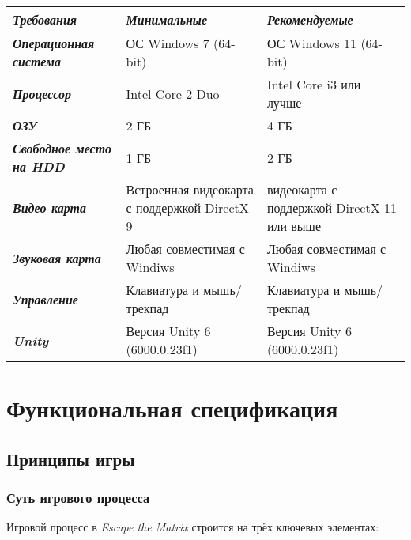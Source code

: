 \documentclass{article}
\begin{document}
\begin{center}
    \begin{tabular}{|p{4cm}|p{4cm}|p{6cm}|}
    \hline
      \textit{\textbf {Требования}}   & \textit{\textbf {Минимальные}}  & \textit{\textbf {Рекомендуемые}}  \\
      [0.5ex]
      \hline 
        \textit{\textbf {Операционная система}} & ОС Windows 7 (64-bit) & ОС Windows 11 (64-bit)\\
        \hline 
         \textit{\textbf {Процессор}} & Intel Core 2 Duo & Intel Core i3 или лучше\\
         \hline
         \textit{\textbf {ОЗУ}} & 2 ГБ & 4 ГБ\\
         \hline
         \textit{\textbf {Свободное место на HDD}} & 1 ГБ& 2 ГБ\\
         \hline
         \textit{\textbf {Видео карта}} & Встроенная видеокарта с поддержкой DirectX 9 & видеокарта с поддержкой DirectX 11 или выше\\
         \hline
         \textit{\textbf {Звуковая карта}} & Любая совместимая с Windiws & Любая совместимая с Windiws\\
         \hline
         \textit{\textbf {Управление}} & Клавиатура и мышь/трекпад & Клавиатура и мышь/трекпад\\ 
         \hline  
         \textit{\textbf {Unity}} & Версия Unity 6 (6000.0.23f1) &Версия Unity 6 (6000.0.23f1)\\ [1ex]
         \hline  
    \end{tabular}
\end{center}

\newpage
\section{Функциональная спецификация}

\subsection{Принципы игры}

\subsubsection{Суть игрового процесса}
Игровой процесс в \textit{Escape the Matrix} строится на трёх ключевых элементах:
\end{document}
